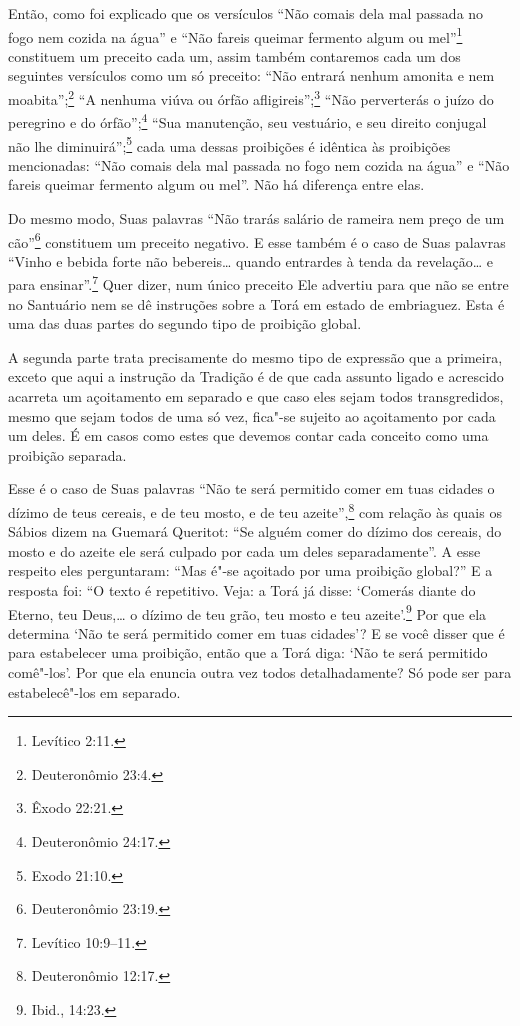 Então, como foi explicado que os versículos ``Não comais dela mal
passada no fogo nem cozida na água'' e ``Não fareis queimar fermento
algum ou mel''\footnote{Levítico 2:11.} constituem um preceito cada um, assim
também contaremos cada um dos seguintes versículos como um só preceito:
``Não entrará nenhum amonita\starr{} e nem moabita\starr'';\footnote{Deuteronômio 23:4.} ``A
nenhuma viúva ou órfão afligireis'';\footnote{Êxodo 22:21.} ``Não perverterás o
juízo do peregrino e do órfão'';\footnote{Deuteronômio 24:17.} ``Sua
manutenção, seu vestuário, e seu direito conjugal não lhe diminuirá'';\footnote{Exodo 21:10.} cada uma dessas proibições é idêntica às proibições
mencionadas: ``Não comais dela mal passada no fogo nem cozida na água''
e ``Não fareis queimar fermento algum ou mel''. Não há diferença entre
elas.

Do mesmo modo, Suas palavras ``Não trarás salário de rameira nem preço
de um cão''\footnote{Deuteronômio 23:19.} constituem um preceito negativo. E esse
também é o caso de Suas palavras ``Vinho e bebida forte não bebereis\ldots{}
quando entrardes à tenda da revelação\ldots{} e para ensinar''.\footnote{Levítico
10:9--11.} Quer dizer, num único preceito Ele advertiu para que não se
entre no Santuário nem se dê instruções sobre a Torá\starr{} em estado de
embriaguez. Esta é uma das duas partes do segundo tipo de proibição
global.

A segunda parte trata precisamente do mesmo tipo de expressão que a
primeira, exceto que aqui a instrução da Tradição é de que cada assunto
ligado e acrescido acarreta um açoitamento em separado e que caso eles
sejam todos transgredidos, mesmo que sejam todos de uma só vez, fica"-se
sujeito ao açoitamento por cada um deles. É em casos como estes que
devemos contar cada conceito como uma proibição separada.



Esse é o caso de Suas palavras ``Não te será permitido comer em tuas
cidades o dízimo de teus cereais, e de teu mosto, e de teu azeite'',\footnote{Deuteronômio 12:17.} com relação às quais os Sábios dizem na Guemará\starr{}
Queritot\starr: ``Se alguém comer do dízimo dos cereais, do mosto e do azeite
ele será culpado por cada um deles separadamente''. A esse respeito eles
perguntaram: ``Mas é"-se açoitado por uma proibição global?'' E a
resposta foi: ``O texto é repetitivo. Veja: a Torá\starr{} já disse: `Comerás
diante do Eterno, teu Deus,\ldots{} o dízimo de teu grão, teu mosto e teu
azeite'.\footnote{Ibid., 14:23.} Por que ela determina `Não te será permitido
comer em tuas cidades'? E se você disser que é para estabelecer uma
proibição, então que a Torá\starr{} diga: `Não te será permitido comê"-los'.
Por que ela enuncia outra vez todos detalhadamente? Só pode ser para
estabelecê"-los em separado.

